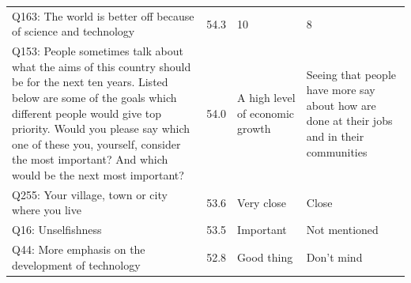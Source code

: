 \begin{tabular}{p{3.1in}lp{1.05in}p{1.05in}}
Q163: The world is better off because of science and technology & 54.3 & 10 & 8 \\
Q153: People sometimes talk about what the aims of this country should be for the next ten years. Listed below are some of the goals which different people would give top priority. Would you please say which one of these you, yourself, consider the most important? And which would be the next most important? & 54.0 & A high level of economic growth & Seeing that people have more say about how are done at their jobs and in their communities \\
Q255: Your village, town or city where you live & 53.6 & Very close & Close \\
Q16: Unselfishness & 53.5 & Important & Not mentioned \\
Q44: More emphasis on the development of technology & 52.8 & Good thing & Don't mind \\
\bottomrule
\end{tabular}

